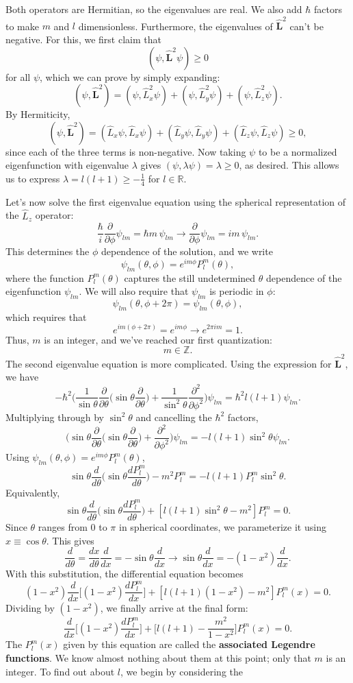 Both operators are Hermitian, so the eigenvalues are real. We also add $\hbar$ factors to make $m$ and $l$ dimensionless. Furthermore, the eigenvalues of $\hat{\mathbf{L}}^2$ can't be negative. For this, we first claim that $$(\psi,\hat{\mathbf{L}}^2\psi)\geq0$$for all $\psi$, which we can prove by simply expanding: $$(\psi,\hat{\mathbf{L}}^2)=(\psi,\hat{L}_x^2\psi)+(\psi,\hat{L}_y^2\psi)+(\psi,\hat{L}_z^2\psi).$$By Hermiticity, $$(\psi,\hat{\mathbf{L}}^2)=(\hat{L}_x\psi,\hat{L}_x\psi)+(\hat{L}_y\psi,\hat{L}_y\psi)+(\hat{L}_z\psi,\hat{L}_z\psi)\geq 0,$$since each of the three terms is non-negative. Now taking $\psi$ to be a normalized eigenfunction with eigenvalue $\lambda$ gives $(\psi,\lambda\psi)=\lambda\geq 0$, as desired. This allows us to express $\lambda=l(l+1)\geq-\frac{1}{4}$ for $l\in\mathbb{R}$.

Let's now solve the first eigenvalue equation using the spherical representation of the $\hat{L}_z$ operator: $$\frac{\hbar}{i}\frac{\partial}{\partial \phi}\psi_{lm}=\hbar m\,\psi_{lm}\rightarrow \frac{\partial}{\partial \phi}\psi_{lm}=im\,\psi_{lm}.$$This determines the $\phi$ dependence of the solution, and we write $$\boxed{\psi_{lm}(\theta,\phi)=e^{im\phi}P_l^m(\theta),}$$where the function $P_l^m(\theta)$ captures the still undetermined $\theta$ dependence of the eigenfunction $\psi_{lm}$. We will also require that $\psi_{lm}$ is periodic in $\phi$: $$\psi_{lm}(\theta,\phi+2\pi)=\psi_{lm}(\theta,\phi),$$which requires that $$e^{im(\phi+2\pi)}=e^{im\phi}\rightarrow e^{2\pi im}=1.$$Thus, $m$ is an integer, and we've reached our first quantization: $$\boxed{m\in\mathbb{Z}.}$$The second eigenvalue equation is more complicated. Using the expression for $\hat{\mathbf{L}}^2$, we have $$-\hbar^2\bigg(\frac{1}{\sin\theta}\frac{\partial}{\partial\theta}\bigg(\sin\theta\frac{\partial}{\partial\theta}\bigg)+\frac{1}{\sin^2\theta}\frac{\partial^2}{\partial\phi^2}\bigg)\psi_{lm}=\hbar^2l(l+1)\psi_{lm}.$$Multiplying through by $\sin^2\theta$ and cancelling the $\hbar^2$ factors, $$\bigg(\sin\theta\frac{\partial}{\partial\theta}\bigg(\sin\theta\frac{\partial}{\partial\theta}\bigg)+\frac{\partial^2}{\partial\phi^2}\bigg)\psi_{lm}=-l(l+1)\sin^2\theta\psi_{lm}.$$Using $\psi_{lm}(\theta,\phi)=e^{im\phi}P_l^m(\theta)$, $$\sin\theta\frac{d}{d\theta}\bigg(\sin\theta\frac{dP_l^m}{d\theta}\bigg)-m^2P_l^m=-l(l+1)P_l^m\sin^2\theta.$$Equivalently, $$\sin\theta\frac{d}{d\theta}\bigg(\sin\theta\frac{dP_l^m}{d\theta}\bigg)+[l(l+1)\sin^2\theta-m^2]P_l^m=0.$$Since $\theta$ ranges from $0$ to $\pi$ in spherical coordinates, we parameterize it using $x\equiv\cos\theta$. This gives $$\frac{d}{d\theta}=\frac{dx}{d\theta}\frac{d}{dx}=-\sin\theta\frac{d}{dx}\rightarrow \sin\theta\frac{d}{dx}=-(1-x^2)\frac{d}{dx}.$$With this substitution, the differential equation becomes $$(1-x^2)\frac{d}{dx}\bigg[(1-x^2)\frac{dP_l^m}{dx}\bigg]+[l(l+1)(1-x^2)-m^2]P_l^m(x)=0.$$Dividing by $(1-x^2)$, we finally arrive at the final form: $$\boxed{\frac{d}{dx}\bigg[(1-x^2)\frac{dP_l^m}{dx}\bigg]+\bigg[l(l+1)-\frac{m^2}{1-x^2}\bigg]P_l^m(x)=0.}$$The $P_l^m(x)$ given by this equation are called the \textbf{associated Legendre functions}. We know almost nothing about them at this point; only that $m$ is an integer. To find out about $l$, we begin by considering the 